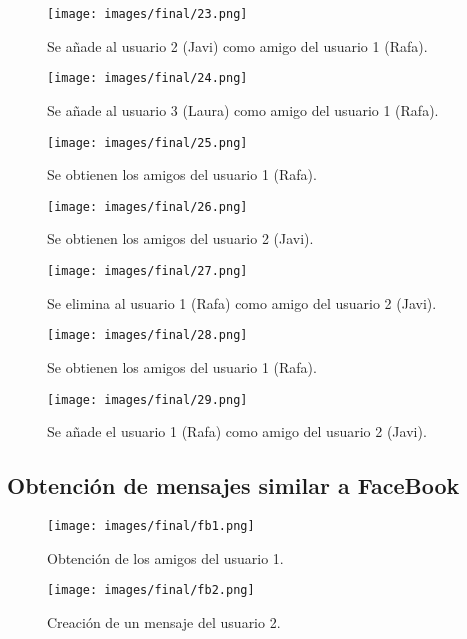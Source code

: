 \documentclass[12pt,a4paper, spanish]{article}
\begin{document}
\begin{figure}[H]
	\centering
	\texttt{[image: images/final/23.png]}
	\caption{Se añade al usuario 2 (Javi) como amigo del usuario 1 (Rafa).}
\end{figure}
\begin{figure}[H]
	\centering
	\texttt{[image: images/final/24.png]}
	\caption{Se añade al usuario 3 (Laura) como amigo del usuario 1 (Rafa).}
\end{figure}
\begin{figure}[H]
	\centering
	\texttt{[image: images/final/25.png]}
	\caption{Se obtienen los amigos del usuario 1 (Rafa).}
\end{figure}
\begin{figure}[H]
	\centering
	\texttt{[image: images/final/26.png]}
	\caption{Se obtienen los amigos del usuario 2 (Javi).}
\end{figure}
\begin{figure}[H]
	\centering
	\texttt{[image: images/final/27.png]}
	\caption{Se elimina al usuario 1 (Rafa) como amigo del usuario 2 (Javi).}
\end{figure}
\begin{figure}[H]
	\centering
	\texttt{[image: images/final/28.png]}
	\caption{Se obtienen los amigos del usuario 1 (Rafa).}
\end{figure}
\begin{figure}[H]
	\centering
	\texttt{[image: images/final/29.png]}
	\caption{Se añade el usuario 1 (Rafa) como amigo del usuario 2 (Javi).}
\end{figure}

\newpage

\subsection{Obtención de mensajes similar a FaceBook}
\begin{figure}[H]
	\centering
	\texttt{[image: images/final/fb1.png]}
	\caption{Obtención de los amigos del usuario 1.}
\end{figure}

\begin{figure}[H]
	\centering
	\texttt{[image: images/final/fb2.png]}
	\caption{Creación de un mensaje del usuario 2.}
\end{figure}
\end{document}
